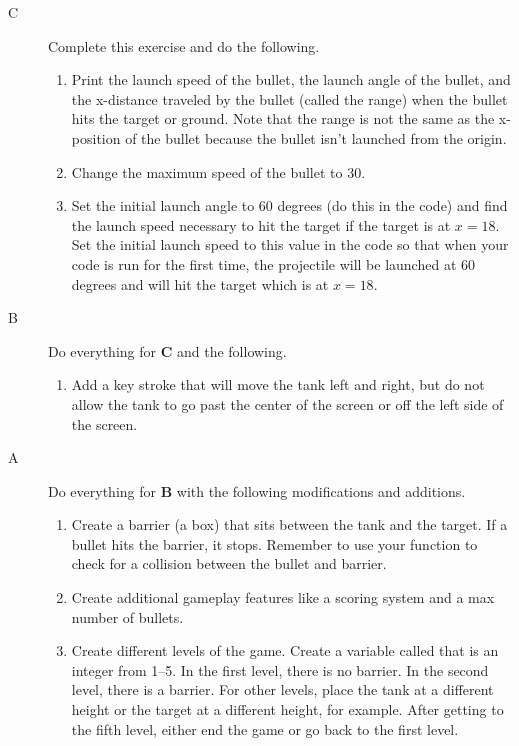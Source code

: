 \newpage


\analysis

\begin{description}

\item[C] Complete this exercise and do the following.

\begin{enumerate}
	\item Print the launch speed of the bullet, the launch angle of the bullet, and the x-distance traveled by the bullet (called the range) when the bullet hits the target or ground. Note that the range is not the same as the x-position of the bullet because the bullet isn't launched from the origin.
	\item Change the maximum speed of the bullet to 30.
	\item Set the initial launch angle to 60 degrees (do this in the code) and find the launch speed necessary to hit the target if the target is at $x=18$. Set the initial launch speed to this value in the code so that when your code is run for the first time, the projectile will be launched at 60 degrees and will hit the target which is at $x=18$.
\end{enumerate}

\item[B] Do everything for {\bf C} and the following.

\begin{enumerate}
	\item Add a key stroke that will move the tank left and right, but do not allow the tank to go past the center of the screen or off the left side of the screen.
\end{enumerate}

\item[A] Do everything for {\bf B} with the following modifications and additions.

\begin{enumerate}
	\item Create a barrier (a box) that sits between the tank and the target. If a bullet hits the barrier, it stops. Remember to use your  function to check for a collision between the bullet and barrier.
	\item Create additional gameplay features like a scoring system and a max number of bullets.
	\item Create different levels of the game. Create a variable called  that is an integer from 1--5. In the first level, there is no barrier. In the second level, there is a barrier. For other levels, place the tank at a different height or the target at a different height, for example. After getting to the fifth level, either end the game or go back to the first level.
\end{enumerate}


\end{description}

